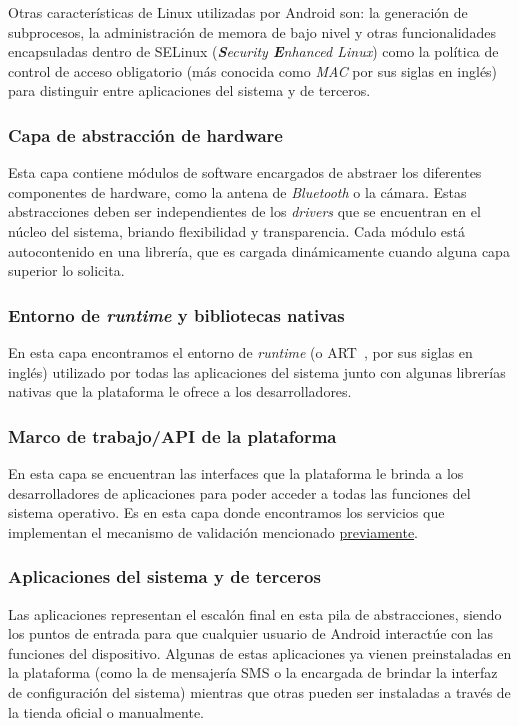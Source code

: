 Otras características de Linux utilizadas por Android son: la generación de subprocesos, la
administración de memora de bajo nivel y otras funcionalidades encapsuladas dentro de SELinux
(\textit{\textbf{S}ecurity \textbf{E}nhanced Linux}) como la política de control de acceso obligatorio
(más conocida como \textit{MAC} por sus siglas en inglés) para distinguir entre aplicaciones del
sistema y de terceros.

\subsubsection*{Capa de abstracción de hardware}
Esta capa contiene módulos de software encargados de abstraer los diferentes componentes de hardware,
como la antena de \textit{Bluetooth} o la cámara. Estas abstracciones deben ser independientes de los
\textit{drivers} que se encuentran en el núcleo del sistema, briando flexibilidad y transparencia.
Cada módulo está autocontenido en una librería, que es cargada dinámicamente cuando alguna capa
superior lo solicita.

\subsubsection*{Entorno de \textit{runtime} y bibliotecas nativas}
En esta capa encontramos el entorno de \textit{runtime} (o ART~\cite{art}, por sus siglas en inglés)
utilizado por todas las aplicaciones del sistema junto con algunas librerías nativas que la plataforma
le ofrece a los desarrolladores.

\subsubsection*{Marco de trabajo/API de la plataforma}
En esta capa se encuentran las interfaces que la plataforma le brinda a los desarrolladores de
aplicaciones para poder acceder a todas las funciones del sistema operativo. Es en esta capa donde
encontramos los servicios que implementan el mecanismo de validación mencionado
\hyperref[section:architecture:kernel]{previamente}.

\subsubsection*{Aplicaciones del sistema y de terceros}
Las aplicaciones representan el escalón final en esta pila de abstracciones, siendo los puntos de
entrada para que cualquier usuario de Android interactúe con las funciones del dispositivo. Algunas de
estas aplicaciones ya vienen preinstaladas en la plataforma (como la de mensajería SMS o la encargada
de brindar la interfaz de configuración del sistema) mientras que otras pueden ser instaladas a través
de la tienda oficial o manualmente.


